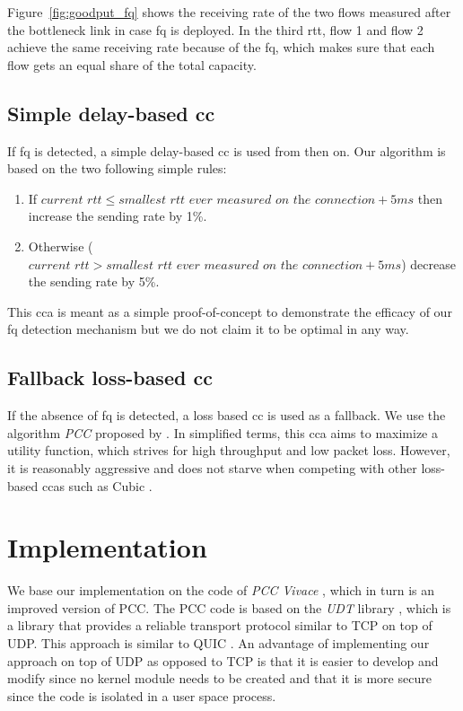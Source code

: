 \documentclass[runningheads]{llncs}
\begin{document}
Figure~\ref{fig:goodput_fq} shows the receiving rate of the two flows measured after the bottleneck link in case \gls{fq} is deployed. In the third \gls{rtt}, flow 1 and flow 2 achieve the same receiving rate because of the \gls{fq}, which makes sure that each flow gets an equal share of the total capacity. 

\subsection{Simple delay-based \gls{cc}}

If \gls{fq} is detected, a simple delay-based \gls{cc} is used from then on. Our algorithm is based on the two following simple rules:
\begin{enumerate}
\item If $\textit{current rtt} \leq \textit{smallest rtt ever measured on the connection} + 5\textit{ms}$ then increase the sending rate by 1\%.
\item Otherwise ($\textit{current rtt} > \textit{smallest rtt ever measured on the connection} + 5\textit{ms}$) decrease the sending rate by 5\%.
\end{enumerate}

This \gls{cca} is meant as a simple proof-of-concept to demonstrate the efficacy of our \gls{fq} detection mechanism but we do not claim it to be optimal in any way. 

\subsection{Fallback loss-based \gls{cc}}

If the absence of \gls{fq} is detected, a loss based \gls{cc} is used as a fallback. We use the algorithm \textit{PCC} proposed by \cite{dong_pcc_2015}. In simplified terms, this \gls{cca} aims to maximize a utility function, which strives for high throughput and low packet loss. However, it is reasonably aggressive and does not starve when competing with other loss-based \glspl{cca} such as Cubic \cite{ha_cubic_2008}.

\section{Implementation}

We base our implementation on the code of \textit{PCC Vivace} \cite{dong_pcc_2018}, which in turn is an improved version of PCC. The PCC code is based on the \textit{UDT} library \cite{gu_udt_2007}, which is a library that provides a reliable transport protocol similar to TCP on top of UDP. This approach is similar to QUIC \cite{iyengar_quic_2018}. An advantage of implementing our approach on top of UDP as opposed to TCP is that it is easier to develop and modify since no kernel module needs to be created and that it is more secure since the code is isolated in a user space process. 
\end{document}
